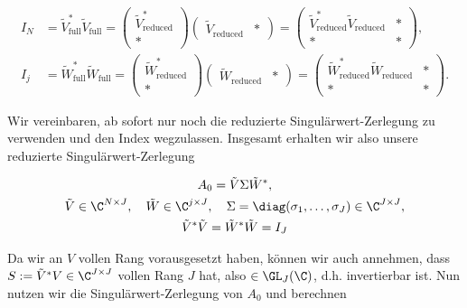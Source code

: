 \begin{align*}
    I_N
    & =
    \tilde V_\mathrm{full}^\ast \tilde V_\mathrm{full}
    =
    \begin{pmatrix}
        \tilde V_\mathrm{reduced}^\ast \\ \ast
    \end{pmatrix}
    \begin{pmatrix}
        \tilde V_\mathrm{reduced} & \ast
    \end{pmatrix}
    =
    \begin{pmatrix}
        \tilde V_\mathrm{reduced}^\ast \tilde V_\mathrm{reduced} & \ast \\
        \ast                                                     & \ast
    \end{pmatrix}, \\
    I_j
    & =
    \tilde W_\mathrm{full}^\ast \tilde W_\mathrm{full}
    =
    \begin{pmatrix}
        \tilde W_\mathrm{reduced}^\ast \\ \ast
    \end{pmatrix}
    \begin{pmatrix}
        \tilde W_\mathrm{reduced} & \ast
    \end{pmatrix}
    =
    \begin{pmatrix}
        \tilde W_\mathrm{reduced}^\ast \tilde W_\mathrm{reduced} & \ast \\
        \ast                                                     & \ast
    \end{pmatrix}.
\end{align*}

Wir vereinbaren, ab sofort nur noch die reduzierte Singulärwert-Zerlegung zu verwenden und den Index wegzulassen.
Insgesamt erhalten wir also unsere reduzierte Singulärwert-Zerlegung

\begin{gather}
    A_0 = \tilde V \Sigma \tilde W^\ast, \nonumber \\
    \tilde V \in \C^{N \times J},
    \quad
    \tilde W \in \C^{j \times J},
    \quad
    \Sigma = \diag(\sigma_1, \dots, \sigma_J) \in \C^{J \times J}, \label{eq:singulaerwert_zerlegung} \\
    \tilde V^\ast \tilde V
    =
    \tilde W^\ast \tilde W
    =
    I_J \nonumber
\end{gather}

Da wir an $V$ vollen Rang vorausgesetzt haben, können wir auch annehmen, dass $S := \tilde V^\ast V \in \C^{J \times J}$ vollen Rang $J$ hat, also $\in \GL_J(\C)$, d.h. invertierbar ist.
Nun nutzen wir die Singulärwert-Zerlegung von $A_0$ und berechnen

